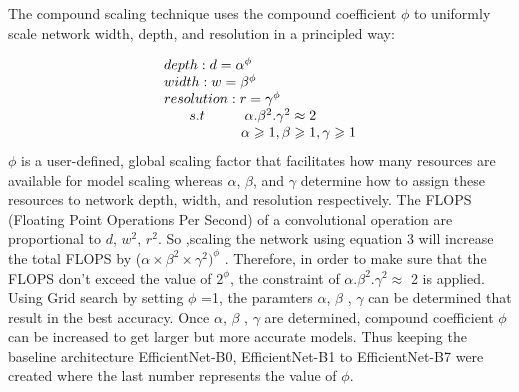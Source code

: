 \documentclass[fleqn,usenatbib]{mnras}
\begin{document}
The compound scaling technique uses the compound coefficient $\phi$ to uniformly scale network width, depth, and resolution in a principled way:

\begin{equation}
    \begin{array}{l}
        depth: d=\alpha^{\phi} \\
        width: w=\beta^{\phi} \\
        resolution : r=\gamma^{\phi} \\
      \hspace{0.25 in}  s.t \hspace{1cm} \alpha.\beta^{2}.\gamma^{2} \approx 2  \\
      \hspace{0.25 in} \hspace{1.3cm} \alpha\geq1, \beta\geq1, \gamma\geq1
    \end{array}
\end{equation}
$\phi$ is a user-defined, global scaling factor that facilitates how many resources are available for model scaling whereas $\alpha$, $\beta$, and $\gamma$ determine how to assign these resources to network depth, width, and resolution respectively. The FLOPS (Floating Point Operations Per Second) of a convolutional operation are proportional to  $d$, $w^2$, $r^2$. So ,scaling the network using equation 3 will increase the total FLOPS by ($\alpha \times \beta^{2} \times \gamma^{2}) ^ \phi$ . Therefore, in order to make sure that the FLOPS don’t exceed the value of $2^\phi$, the constraint of $\alpha.\beta^{2}.\gamma^{2} \approx$ 2  is applied. Using Grid search by setting $\phi$ =1, the paramters $\alpha$, $\beta$ , $\gamma$ can be determined that result in the best accuracy. Once $\alpha$, $\beta$ , $\gamma$ are determined, compound coefficient $\phi$ can be increased to get larger but more accurate models. Thus keeping the baseline architecture EfficientNet-B0, EfficientNet-B1 to EfficientNet-B7 were created where the last number represents the value of $\phi$.
\end{document}
